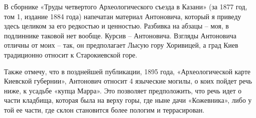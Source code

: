 
В сборнике «Труды четвертого Археологического съезда в Казани» (за 1877 год, том 1, издание 1884 года) напечатан материал Антоновича, который я приведу здесь целиком за его редкостью и ценностью. Разбивка на абзацы – моя, в подлиннике таковой нет вообще. Курсив – Антоновича. Взгляды Антоновича отличны от моих – так, он предполагает Лысую гору Хоривицей, а град Киев традиционно относит к Старокиевской горе. 

Также отмечу, что в позднейшей публикации, 1895 года, «Археологической карте Киевской губернии», Антонович относит 4 языческие могилы, о коих пойдет речь ниже, к усадьбе «купца Марра». Это позволяет предположить, что речь идет о части кладбища, которая была на верху горы, где ныне дачи «Кожевника», либо у той ее части, где склон становится более пологим и террасирован.

